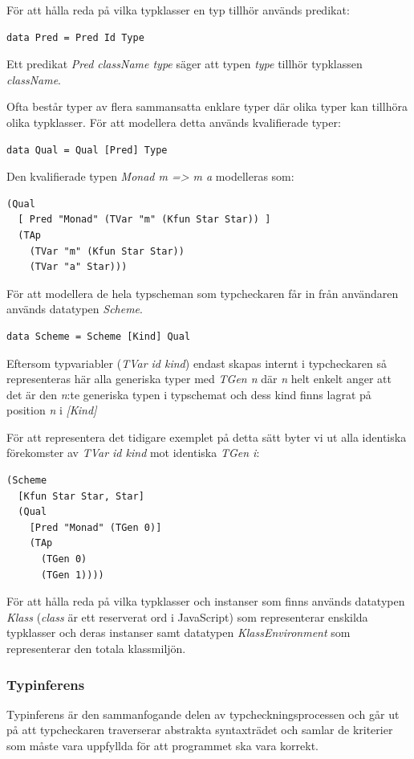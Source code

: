 För att hålla reda på vilka typklasser en typ tillhör används predikat:
\begin{lstlisting}
data Pred = Pred Id Type
\end{lstlisting}
Ett predikat \emph{Pred className type} säger att typen \emph{type} tillhör typklassen \emph{className}.

Ofta består typer av flera sammansatta enklare typer där olika typer kan tillhöra olika typklasser. För att modellera detta används kvalifierade typer:
\begin{lstlisting}
data Qual = Qual [Pred] Type
\end{lstlisting}

Den kvalifierade typen \emph{Monad m => m a} modelleras som:
\begin{lstlisting}
(Qual
  [ Pred "Monad" (TVar "m" (Kfun Star Star)) ]
  (TAp
    (TVar "m" (Kfun Star Star))
    (TVar "a" Star)))
\end{lstlisting}

För att modellera de hela typscheman som typcheckaren får in från användaren används datatypen \emph{Scheme}.
\begin{lstlisting}
data Scheme = Scheme [Kind] Qual
\end{lstlisting}
Eftersom typvariabler (\emph{TVar id kind}) endast skapas internt i typcheckaren så representeras här alla generiska typer med \emph{TGen n} där \emph{n} helt enkelt anger att det är den \emph{n}:te generiska typen i typschemat och dess kind finns lagrat på position \emph{n} i \emph{[Kind]}

För att representera det tidigare exemplet på detta sätt byter vi ut alla identiska förekomster av \emph{TVar id kind} mot identiska \emph{TGen i}:
\begin{lstlisting}
(Scheme
  [Kfun Star Star, Star]
  (Qual
    [Pred "Monad" (TGen 0)]
    (TAp
      (TGen 0)
      (TGen 1))))
\end{lstlisting}

För att hålla reda på vilka typklasser och instanser som finns används datatypen \emph{Klass} (\emph{class} är ett reserverat ord i JavaScript) som representerar enskilda typklasser och deras instanser samt datatypen \emph{KlassEnvironment} som representerar den totala klassmiljön.

\subsubsection{Typinferens}
Typinferens är den sammanfogande delen av typcheckningsprocessen och går ut på att typcheckaren traverserar abstrakta syntaxträdet och samlar de kriterier som måste vara uppfyllda för att programmet ska vara korrekt.

